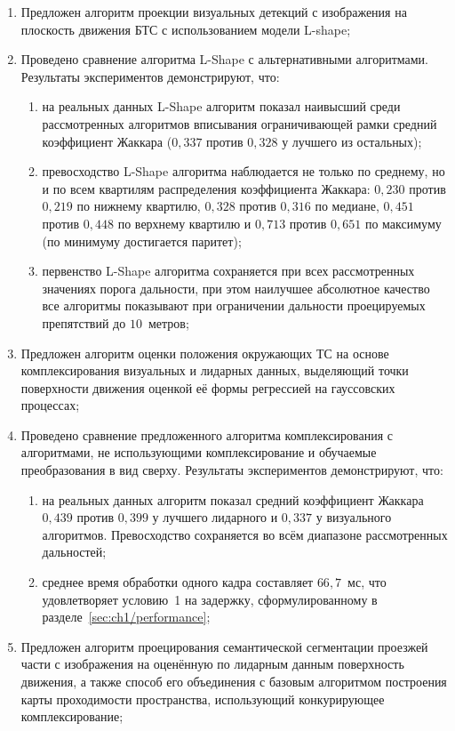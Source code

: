 \begin{enumerate}
	\item Предложен алгоритм проекции визуальных детекций с изображения на плоскость движения БТС с использованием модели L-shape; 
	\item Проведено сравнение алгоритма L-Shape с альтернативными алгоритмами. Результаты экспериментов демонстрируют, что: 
	\begin{enumerate}
		\item на реальных данных L-Shape алгоритм показал наивысший среди рассмотренных алгоритмов вписывания ограничивающей рамки средний коэффициент Жаккара ($0,337$ против $0,328$ у лучшего из остальных);
		\item превосходство L-Shape алгоритма наблюдается не только по среднему, но и по всем квартилям распределения коэффициента Жаккара: $0,230$ против $0,219$ по нижнему квартилю, $0,328$ против $0,316$ по медиане, $0,451$ против $0,448$ по верхнему квартилю и $0,713$ против $0,651$ по максимуму (по минимуму достигается паритет);
		\item первенство L-Shape алгоритма сохраняется при всех рассмотренных значениях порога дальности, при этом наилучшее абсолютное качество все алгоритмы показывают при ограничении дальности проецируемых препятствий до $10$~метров;
	\end{enumerate}
	\item Предложен алгоритм оценки положения окружающих ТС на основе комплексирования визуальных и лидарных данных, выделяющий точки поверхности движения оценкой её формы регрессией на гауссовских процессах;
	\item Проведено сравнение предложенного алгоритма комплексирования с алгоритмами, не использующими комплексирование и обучаемые преобразования в вид сверху. Результаты экспериментов демонстрируют, что:
	\begin{enumerate}
		\item на реальных данных алгоритм показал средний коэффициент Жаккара $0,439$ против $0,399$ у лучшего лидарного и $0,337$ у визуального алгоритмов. Превосходство сохраняется во всём диапазоне рассмотренных дальностей;
		\item среднее время обработки одного кадра составляет $66,7$~мс, что удовлетворяет условию~1 на задержку, сформулированному в разделе~\cref{sec:ch1/performance};
	\end{enumerate}
	\item Предложен алгоритм проецирования семантической сегментации проезжей части с изображения на оценённую по лидарным данным поверхность движения, а также способ его объединения с базовым алгоритмом построения карты проходимости пространства, использующий конкурирующее комплексирование;

\end{enumerate}
